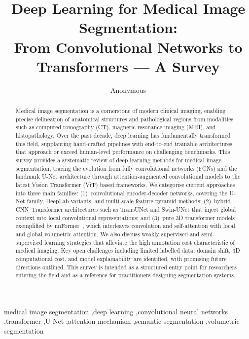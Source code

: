 \documentclass[preprint,12pt,authoryear]{elsarticle}
\begin{document}
\begin{frontmatter}

\title{Deep Learning for Medical Image Segmentation:\\
From Convolutional Networks to Transformers --- A Survey}

\author[a]{Anonymous}

\begin{abstract}
Medical image segmentation is a cornerstone of modern clinical imaging, enabling
precise delineation of anatomical structures and pathological regions from
modalities such as computed tomography (CT), magnetic resonance imaging (MRI),
and histopathology. Over the past decade, deep learning has fundamentally
transformed this field, supplanting hand-crafted pipelines with end-to-end
trainable architectures that approach or exceed human-level performance on
challenging benchmarks. This survey provides a systematic review of deep
learning methods for medical image segmentation, tracing the evolution from
fully convolutional networks (FCNs) and the landmark U-Net architecture through
attention-augmented convolutional models to the latest Vision Transformer (ViT)
based frameworks. We categorise current approaches into three main families:
(1)~convolutional encoder-decoder networks, covering the U-Net family, DeepLab
variants, and multi-scale feature pyramid methods; (2)~hybrid CNN--Transformer
architectures such as TransUNet and Swin-UNet that inject global context into
local convolutional representations; and (3)~pure 3D transformer models
exemplified by nnFormer~\citep{zhou2023nnformer}, which interleaves convolution
and self-attention with local and global volumetric attention. We also discuss
weakly supervised and semi-supervised learning strategies that alleviate the
high annotation cost characteristic of medical imaging. Key open challenges
including limited labelled data, domain shift, 3D computational cost, and
model explainability are identified, with promising future directions outlined.
This survey is intended as a structured entry point for researchers entering
the field and as a reference for practitioners designing segmentation systems.
\end{abstract}

\begin{keyword}
medical image segmentation \sep deep learning \sep convolutional neural networks
\sep transformer \sep U-Net \sep attention mechanism \sep semantic segmentation
\sep volumetric segmentation
\end{keyword}

\end{frontmatter}
\end{document}
